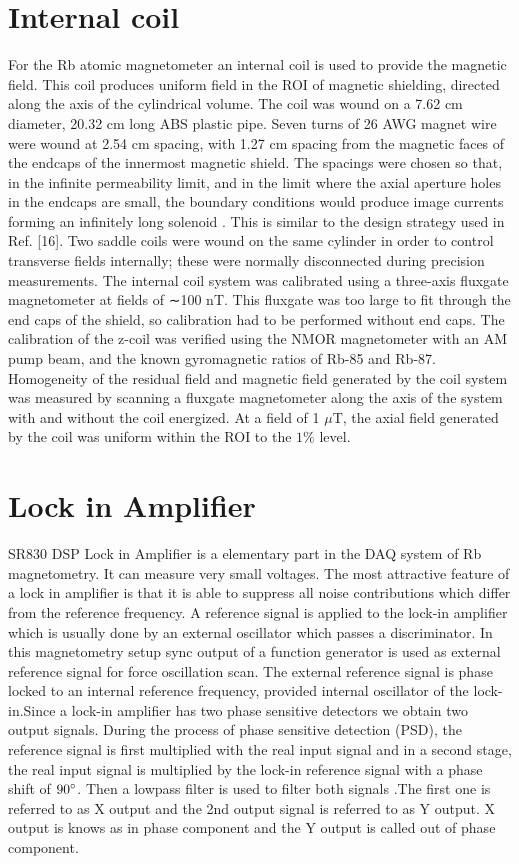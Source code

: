 \documentclass[12pt]{report}
\begin{document}
\section{Internal coil}
 For the Rb atomic magnetometer an internal coil is used to provide the magnetic field. This coil produces uniform field in the ROI of magnetic shielding, directed along the axis of the cylindrical volume. The coil was wound on a 7.62 cm diameter, 20.32 cm long ABS plastic pipe. Seven turns of 26 AWG magnet wire were wound at 2.54 cm spacing, with 1.27 cm spacing from the magnetic faces of the endcaps of the innermost magnetic shield. The spacings were chosen so that, in the infinite permeability limit, and in the limit where the axial aperture holes in the endcaps are small, the boundary conditions would produce image currents forming an infinitely long solenoid . This is similar to the design strategy used in Ref. [16]. Two saddle coils were wound on the same cylinder in order to control transverse fields internally; these were normally disconnected during precision measurements. The internal coil system was calibrated using a three-axis fluxgate magnetometer at fields of ∼100 nT. This fluxgate was too large to fit through the end caps of the shield, so calibration
had to be performed without end caps. The calibration of the z-coil was verified using the NMOR magnetometer with an AM pump beam, and the known gyromagnetic ratios of Rb-85 and Rb-87. Homogeneity of the residual field and magnetic field generated by the coil system was measured by scanning a fluxgate magnetometer along the axis of the system with and without the coil energized. At a field of 1 $\mu$T, the axial field generated by the coil was uniform within the ROI to the $1\%$  level.
\section{Lock in Amplifier}
SR830 DSP Lock in Amplifier is a elementary part in the DAQ system of Rb magnetometry. It can measure very  small voltages. The most attractive feature of a lock in amplifier is that it is able to suppress all noise contributions which differ from the reference frequency. A reference signal is applied to the lock-in amplifier which is usually done by an external oscillator which passes a discriminator. In this magnetometry setup sync output of a function generator is used as external reference signal for force oscillation scan. The external reference signal is phase locked to an internal reference frequency, provided internal oscillator of the lock-in.Since a lock-in amplifier has two phase sensitive detectors we obtain two output signals. During the process of phase sensitive detection (PSD), the reference signal is first multiplied with the real input signal  and in a second stage, the real input signal is multiplied by
the lock-in reference signal with a phase shift of $90\degree$. Then a lowpass filter is used to filter both signals .The first one is referred to as X output and the 2nd output signal is referred to as Y output. X output is knows as in phase component and the Y output is called out of phase component.
\end{document}
